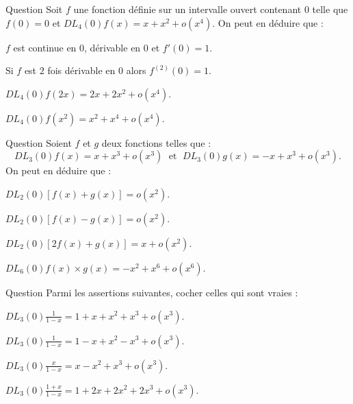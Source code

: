 

\begin{multi}[multiple,feedback=
{On a : \(\displaystyle \lim _{x\to 0}f(x)=0=f(0)\). Donc \(f\) est continue en \(0\). L'existence du \(DL\) à l'ordre \(1\) en \(0\) implique que \(f\) est dérivable en \(0\) et si \(f\) est \(2\) fois dérivable en \(0\) alors \(f^{(2)}(0)=2\). Enfin, \(DL_2(0)f(2x)=2x+4x^2+o(x^4)\) et 
\[DL_8(0)f(x^2)=x^2+x^4+o(x^8)\Rightarrow DL_4(0)f(x^2)=x^2+x^4+o(x^4).\]
}]{Question}
Soit \(f\) une fonction définie sur un intervalle ouvert contenant \(0\) telle que \(f(0)=0\) et \(DL_4(0)f(x)=x+x^2+o(x^4)\). On peut en déduire que :

    \item* \(f\) est continue en \(0\), dérivable en \(0\) et \(f'(0)=1\).
    \item Si \(f\) est \(2\) fois dérivable en \(0\) alors \(f^{(2)}(0)=1\).
    \item \(\displaystyle DL_4(0)f(2x)=2x+2x^2+o(x^4)\).
    \item* \(\displaystyle DL_4(0)f(x^2)=x^2+x^4+o(x^4)\).
\end{multi}


\begin{multi}[multiple,feedback=
{Découle des opérations sur les DL en remarquant que la somme ou le produit de deux DL du même ordre donne un DL du même ordre.
}]{Question}
Soient \(f\) et \(g\) deux fonctions telles que : 
\[DL_3(0)f(x)=x+x^3+o(x^3)\; \mbox{ et }\; DL_3(0)g(x)=-x+x^3+o(x^3).\]
On peut en déduire que :

    \item* \(DL_2(0)\left[f(x)+g(x)\right]=o(x^2)\).
    \item \(DL_2(0)\left[f(x)-g(x)\right]=o(x^2)\).
    \item* \(DL_2(0)\left[2f(x)+g(x)\right]=x+o(x^2)\).
    \item \(\displaystyle DL_6(0)f(x)\times g(x)=-x^2+x^6+o(x^6)\).
\end{multi}


\begin{multi}[multiple,feedback=
{On a le DL usuel suivant : \(\displaystyle \frac{1}{1-x}=1+x+x^2+x^3+o(x^3)\). On en déduit que 
\[\frac{x}{1-x}=x(1+x+x^2+x^3+o(x^3))=x+x^2+x^3+o(x^3)\]
et
\[\frac{1+x}{1-x}=(1+x)(1+x+x^2+x^3+o(x^3))=1+2x+2x^2+2x^3+o(x^3).\]
}]{Question}
Parmi les assertions suivantes, cocher celles qui sont vraies :

    \item* \(\displaystyle DL_3(0)\frac{1}{1-x}=1+x+x^2+x^3+o(x^3)\).
    \item \(\displaystyle DL_3(0)\frac{1}{1-x}=1-x+x^2-x^3+o(x^3)\).
    \item \(\displaystyle DL_3(0)\frac{x}{1-x}=x-x^2+x^3+o(x^3)\).
    \item* \(\displaystyle DL_3(0)\frac{1+x}{1-x}=1+2x+2x^2+2x^3+o(x^3)\).
\end{multi}


